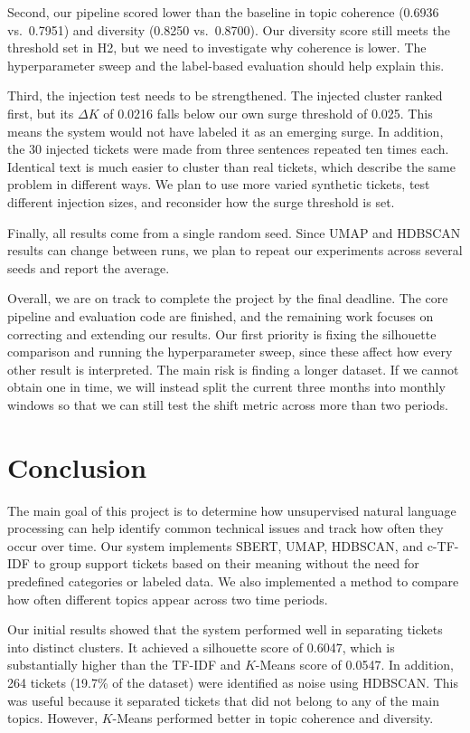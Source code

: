 \documentclass[11pt]{article}
\begin{document}
Second, our pipeline scored lower than the baseline in topic coherence (0.6936 vs.\ 0.7951) and diversity (0.8250 vs.\ 0.8700). Our diversity score still meets the threshold set in H2, but we need to investigate why coherence is lower. The hyperparameter sweep and the label-based evaluation should help explain this.

Third, the injection test needs to be strengthened. The injected cluster ranked first, but its $\Delta K$ of 0.0216 falls below our own surge threshold of 0.025. This means the system would not have labeled it as an emerging surge. In addition, the 30 injected tickets were made from three sentences repeated ten times each. Identical text is much easier to cluster than real tickets, which describe the same problem in different ways. We plan to use more varied synthetic tickets, test different injection sizes, and reconsider how the surge threshold is set.

Finally, all results come from a single random seed. Since UMAP and HDBSCAN results can change between runs, we plan to repeat our experiments across several seeds and report the average.

Overall, we are on track to complete the project by the final deadline. The core pipeline and evaluation code are finished, and the remaining work focuses on correcting and extending our results. Our first priority is fixing the silhouette comparison and running the hyperparameter sweep, since these affect how every other result is interpreted. The main risk is finding a longer dataset. If we cannot obtain one in time, we will instead split the current three months into monthly windows so that we can still test the shift metric across more than two periods.

\section{Conclusion}
The main goal of this project is to determine how unsupervised natural language processing can help identify common technical issues and track how often they occur over time. Our system implements SBERT, UMAP, HDBSCAN, and c-TF-IDF to group support tickets based on their meaning without the need for predefined categories or labeled data. We also implemented a method to compare how often different topics appear across two time periods.

Our initial results showed that the system performed well in separating tickets into distinct clusters. It achieved a silhouette score of 0.6047, which is substantially higher than the TF-IDF and $K$-Means score of 0.0547. In addition, 264 tickets (19.7\% of the dataset) were identified as noise using HDBSCAN. This was useful because it separated tickets that did not belong to any of the main topics. However, $K$-Means performed better in topic coherence and diversity.
\end{document}
